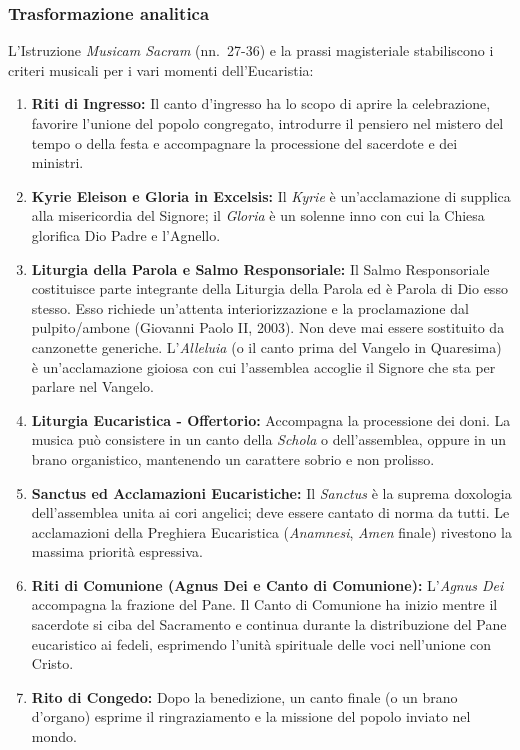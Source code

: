 \documentclass[12pt,a4paper]{article}
\begin{document}
	\subsubsection{Trasformazione analitica}\label{trasformazione-analitica-6}
	
	L'Istruzione \emph{Musicam Sacram} (nn.~27-36) e la prassi magisteriale stabiliscono i criteri musicali per i vari momenti dell'Eucaristia:
	
	\begin{enumerate}[label=\arabic*.,leftmargin=*]
		\item \textbf{Riti di Ingresso:} Il canto d'ingresso ha lo scopo di aprire la celebrazione, favorire l'unione del popolo congregato, introdurre il pensiero nel mistero del tempo o della festa e accompagnare la processione del sacerdote e dei ministri.
		\item \textbf{Kyrie Eleison e Gloria in Excelsis:} Il \emph{Kyrie} è un'acclamazione di supplica alla misericordia del Signore; il \emph{Gloria} è un solenne inno con cui la Chiesa glorifica Dio Padre e l'Agnello.
		\item \textbf{Liturgia della Parola e Salmo Responsoriale:} Il Salmo Responsoriale costituisce parte integrante della Liturgia della Parola ed è Parola di Dio esso stesso. Esso richiede un'attenta interiorizzazione e la proclamazione dal pulpito/ambone (Giovanni Paolo II, 2003). Non deve mai essere sostituito da canzonette generiche. L'\emph{Alleluia} (o il canto prima del Vangelo in Quaresima) è un'acclamazione gioiosa con cui l'assemblea accoglie il Signore che sta per parlare nel Vangelo.
		\item \textbf{Liturgia Eucaristica - Offertorio:} Accompagna la processione dei doni. La musica può consistere in un canto della \emph{Schola} o dell'assemblea, oppure in un brano organistico, mantenendo un carattere sobrio e non prolisso.
		\item \textbf{Sanctus ed Acclamazioni Eucaristiche:} Il \emph{Sanctus} è la suprema doxologia dell'assemblea unita ai cori angelici; deve essere cantato di norma da tutti. Le acclamazioni della Preghiera Eucaristica (\emph{Anamnesi}, \emph{Amen} finale) rivestono la massima priorità espressiva.
		\item \textbf{Riti di Comunione (Agnus Dei e Canto di Comunione):} L'\emph{Agnus Dei} accompagna la frazione del Pane. Il Canto di Comunione ha inizio mentre il sacerdote si ciba del Sacramento e continua durante la distribuzione del Pane eucaristico ai fedeli, esprimendo l'unità spirituale delle voci nell'unione con Cristo.
		\item \textbf{Rito di Congedo:} Dopo la benedizione, un canto finale (o un brano d'organo) esprime il ringraziamento e la missione del popolo inviato nel mondo.
	\end{enumerate}
	
\end{document}
